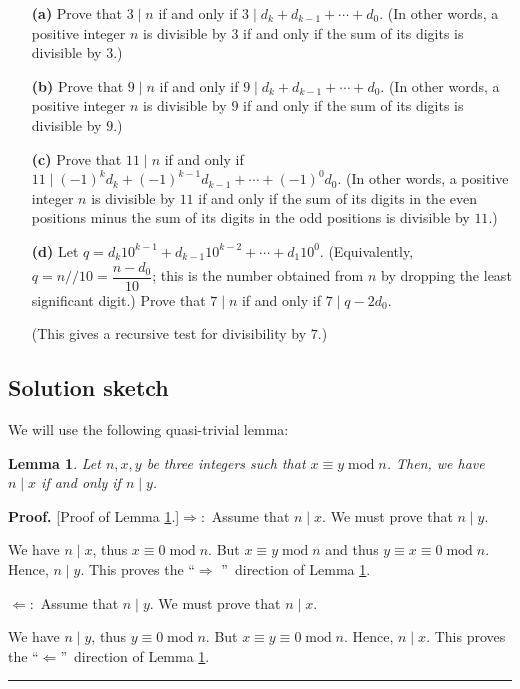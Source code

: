 \documentclass[paper=a4, fontsize=12pt]{scrartcl}%
\theoremstyle{plainsl}
\newtheorem{lemma}[theorem]{Lemma}
\theoremstyle{definition}
\theoremstyle{remark}
\newenvironment{proof}[1][Proof]{\noindent\textbf{#1.} }{\ \rule{0.5em}{0.5em}}
\begin{document}
\begin{enumerate}
\item[\textbf{(a)}] Prove that $3 \mid n$ if and only if $3 \mid d_{k} +
d_{k-1} + \cdots+ d_{0}$. (In other words, a positive integer $n$ is divisible
by $3$ if and only if the sum of its digits is divisible by $3$.)

\item[\textbf{(b)}] Prove that $9 \mid n$ if and only if $9 \mid d_{k} +
d_{k-1} + \cdots+ d_{0}$. (In other words, a positive integer $n$ is divisible
by $9$ if and only if the sum of its digits is divisible by $9$.)

\item[\textbf{(c)}] Prove that $11 \mid n$ if and only if $11 \mid\left(  -1
\right)  ^{k} d_{k} + \left(  -1 \right)  ^{k-1} d_{k-1} + \cdots+ \left(  -1
\right)  ^{0} d_{0}$. (In other words, a positive integer $n$ is divisible by
$11$ if and only if the sum of its digits in the even positions minus the sum
of its digits in the odd positions is divisible by $11$.)

\item[\textbf{(d)}] Let $q = d_{k} 10^{k-1} + d_{k-1} 10^{k-2} + \cdots+ d_{1}
10^{0}$. (Equivalently, $q = n // 10 = \dfrac{n-d_{0}}{10}$; this is the
number obtained from $n$ by dropping the least significant digit.) Prove that
$7 \mid n$ if and only if $7 \mid q - 2 d_{0}$.

(This gives a recursive test for divisibility by $7$.)
\end{enumerate}



\subsection{Solution sketch}

We will use the following quasi-trivial lemma:

\begin{lemma}
\label{lem.ent.mod.ndivx=ndivy}Let $n,x,y$ be three integers such that
$x\equiv y\operatorname{mod}n$. Then, we have $n\mid x$ if and only if $n\mid
y$.
\end{lemma}

\begin{proof}
[Proof of Lemma \ref{lem.ent.mod.ndivx=ndivy}.]$\Longrightarrow:$ Assume that
$n\mid x$. We must prove that $n\mid y$.

We have $n\mid x$, thus $x\equiv0\operatorname{mod}n$. But $x\equiv
y\operatorname{mod}n$ and thus $y\equiv x\equiv0\operatorname{mod}n$. Hence,
$n\mid y$. This proves the \textquotedblleft$\Longrightarrow$%
\textquotedblright\ direction of Lemma \ref{lem.ent.mod.ndivx=ndivy}.

$\Longleftarrow:$ Assume that $n\mid y$. We must prove that $n\mid x$.

We have $n\mid y$, thus $y\equiv0\operatorname{mod}n$. But $x\equiv
y\equiv0\operatorname{mod}n$. Hence, $n\mid x$. This proves the
\textquotedblleft$\Longleftarrow$\textquotedblright\ direction of Lemma
\ref{lem.ent.mod.ndivx=ndivy}.
\end{proof}
\end{document}
